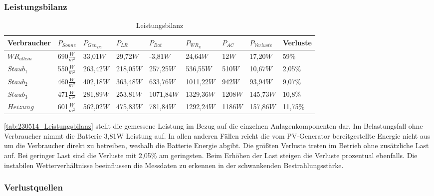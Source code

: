 \subsubsection{Leistungsbilanz}
\begin{table}[!ht]
\centering
\caption{Leistungsbilanz}
\small
\renewcommand{\arraystretch}{1.5}
\begin{tabularx}{\linewidth}{|l|X|X|X|X|X|X|X|X|}
\hline
\rowcolor[HTML]{76B900} 
Verbraucher &$P_{Sonne}$ & $P_{Gen_{DC}}$ & $P_{LR}$ & $P_{Bat}$ & $P_{WR_E}$ & $P_{AC}$ & $P_{Verluste}$ & Verluste \\ \hline
\cellcolor[HTML]{CFE5A8}${WR}_{allein}$ & 690$\frac{W}{m^2}$     &33,01$W$ & 29,72$W$ & -3,81$W$ & 24,64$W$ & 12$W$ & 17,20$W$ & 59\% \\ \hline
\cellcolor[HTML]{CFE5A8}$Staub_{1}$     & 550$\frac{W}{m^2}$ & 263,42$W$ & 218,05$W$ &  257,25$W$ & 536,55$W$ & 510$W$ & 10,67$W$                  & 2,05\%    \\ \hline
\cellcolor[HTML]{CFE5A8}$Staub_{2}$     & 460$\frac{W}{m^2}$ & 402,18$W$ & 363,48$W$ &  633,76$W$ & 1011,22$W$ & 942$W$ & 93,94$W$                  & 9,07\%    \\ \hline
\cellcolor[HTML]{CFE5A8}$Staub_{3}$     &471$\frac{W}{m^2}$  & 281,89$W$ & 253,81$W$ & 1071,84$W$ & 1329,36$W$ & 1208$W$ & 145,73$W$                 & 10,8\%    \\ \hline
\cellcolor[HTML]{CFE5A8}$Heizung$  &601$\frac{W}{m^2}$  & 562,02$W$ & 475,83$W$ &  781,84$W$ & 1292,24$W$ & 1186$W$ & 157,86$W$                  & 11,75\%    \\ \hline
\end{tabularx}
\label{tab:230514_Leistungsbilanz}
\end{table}

\autoref{tab:230514_Leistungsbilanz} stellt die gemessene Leistung im Bezug auf die einzelnen Anlagenkomponenten dar.
Im Belastungsfall ohne Verbraucher nimmt die Batterie 3,81W Leistung auf. In allen anderen Fällen reicht die vom PV-Generator bereitgestellte Energie nicht aus um die Verbraucher direkt zu betreiben, weshalb die Batterie Energie abgibt. Die größten Verluste treten im Betrieb ohne zusätzliche Last auf. Bei geringer Last sind die Verluste mit 2,05\% am geringsten. Beim Erhöhen der Last steigen die Verluste prozentual ebenfalls. 
Die instabilen Wetterverhältnisse beeinflussen die Messdaten zu erkennen in der schwankenden Bestrahlungsstärke.



\subsubsection{Verlustquellen}

